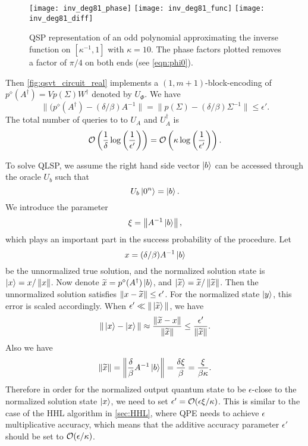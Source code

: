\begin{figure}[H]
\begin{center}
\texttt{[image: inv\_deg81\_phase]}
\texttt{[image: inv\_deg81\_func]}
\texttt{[image: inv\_deg81\_diff]}
\end{center}
\caption{QSP representation of an odd polynomial approximating the inverse function on $[\kappa^{-1},1]$ with $\kappa=10$. The phase factors plotted removes a factor of $\pi/4$ on both ends (see \cref{eqn:phi0}).}
\label{fig:qsp_inv_deg81}
\end{figure}
 

Then \cref{fig:qsvt_circuit_real} implements a $(1,m+1)$-block-encoding of $p^{\diamond}(A^\dagger)=V p(\Sigma)W^\dagger$ denoted by $U_{\Phi}$. We have
\begin{equation}
\label{eq:block_encoding_err_A_inv}
    \|(p^{\diamond}(A^\dagger)-(\delta/\beta)A^{-1}\|=\|p(\Sigma)-(\delta/\beta)\Sigma^{-1}\|\leq \epsilon'.
\end{equation}
The total number of queries to to $U_A$ and $U_A^{\dag}$ is
\begin{equation}
\mathcal{O}\left(\frac{1}{\delta}\log\left(\frac{1}{\epsilon'}\right)\right)
=\mathcal{O}\left(\kappa\log\left(\frac{1}{\epsilon'}\right)\right).
\end{equation}

To solve QLSP, we assume the right hand side vector $\ket{b}$ can be accessed through the oracle $U_b$ such that
\begin{equation}
U_b\ket{0^n}=\ket{b}.
\end{equation}
We introduce the parameter 
\begin{equation}
\xi=\left\lVert A^{-1}\ket{b}\right\rVert,
\end{equation}
which plays an important part in the success probability of the procedure. Let 
\begin{equation}
x=(\delta/\beta)A^{-1}\ket{b}
\end{equation}
be the unnormalized true solution, and the normalized solution state is  $\ket{x}=x/\left\lVert x\right\rVert$.
Now denote $\widetilde{x}=p^{\diamond}(A^{\dagger})\ket{b}$, and $\ket{\widetilde{x}}=\widetilde{x}/\left\lVert\widetilde{x}\right\rVert$. Then the unnormalized solution satisfies $\|x-\widetilde{x}\|\leq\epsilon'$. 
For the normalized state $\ket{y}$, this error is scaled accordingly. When $\epsilon'\ll \|\ket{\widetilde{x}}\|$, we have
\begin{equation}
\|\ket{x}-\ket{x}\|\approx \frac{\|\widetilde{x}-x\|}{\|\widetilde{x}\|}\leq \frac{\epsilon'}{\|\widetilde{x}\|}.
\end{equation}
Also we have
\begin{equation}
\|\widetilde{x}\| = \left\|\frac{\delta}{\beta}A^{-1}\ket{b}\right\| = \frac{\delta\xi}{\beta} = \frac{\xi}{\beta\kappa}.
\end{equation}
Therefore in order for the normalized output quantum state to be $\epsilon$-close to the normalized solution state $\ket{x}$, we need to set $\epsilon'=\mathcal{O}(\epsilon  \xi /\kappa)$.
This is similar to the case of the HHL algorithm in \cref{sec:HHL}, where QPE needs to achieve $\epsilon$ multiplicative accuracy, which means that the additive accuracy parameter $\epsilon'$ should be set to $\mathcal{O}(\epsilon/\kappa)$.

